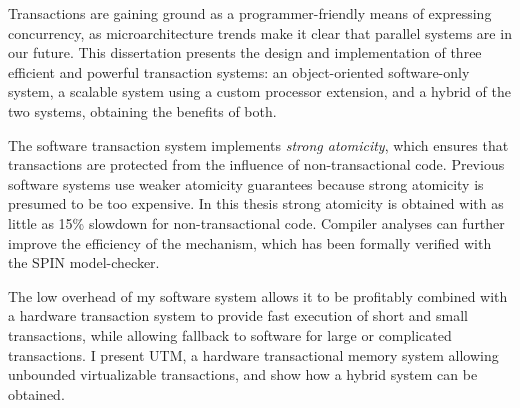 {\sis

Transactions are gaining ground as a programmer-friendly means of
expressing concurrency, as microarchitecture trends make it
clear that parallel systems are in our future.  This dissertation
presents the design and implementation of three efficient and powerful
transaction systems: an object-oriented software-only system, a
scalable system using a custom processor extension, and a hybrid of
the two systems, obtaining the benefits of both.

The software transaction system implements \textit{strong atomicity},
which ensures that transactions are protected from the influence of
non-transactional code.  Previous software systems use weaker
atomicity guarantees because strong atomicity is presumed to be too
expensive.  In this thesis strong atomicity is obtained with as little
as 15\% slowdown for non-transactional code.  Compiler analyses can
further improve the efficiency of the mechanism, which has been
formally verified with the SPIN model-checker.

The low overhead of my software system allows it to be profitably
combined with a hardware transaction system to provide fast execution
of short and small transactions, while allowing fallback to software
for large or complicated transactions.  I present UTM, a hardware
transactional memory system allowing unbounded virtualizable
transactions, and show how a hybrid system can be obtained.

}

